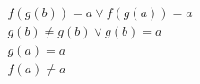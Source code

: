 \begin{align*}
%
& f(g(b)) = a \lor f(g(a)) = a
~\\~
& g(b)  \neq  g(b) \lor g(b) = a
~\\~
& g(a) = a
~\\~
& f(a)  \neq  a
%
\end{align*}
